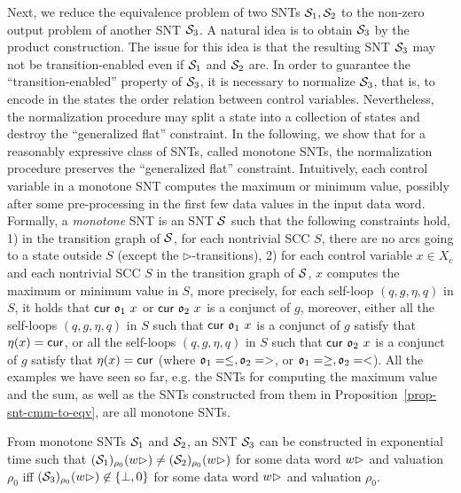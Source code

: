 Next, we reduce the equivalence problem of two SNTs ${\mathcal{S} }_1, {\mathcal{S} }_2$ to the non-zero output problem of another SNT ${\mathcal{S} }_3$. A natural idea is to obtain ${\mathcal{S} }_3$ by the product construction. The issue for this idea is that the resulting SNT ${\mathcal{S} }_3$ may not be transition-enabled even if ${\mathcal{S} }_1$ and ${\mathcal{S} }_2$ are. In order to guarantee the ``transition-enabled'' property of ${\mathcal{S} }_3$, it is necessary to normalize ${\mathcal{S} }_3$, that is, to encode in the states the order relation between control variables. Nevertheless, the normalization procedure may split a state into a collection of states and destroy the ``generalized flat'' constraint. In the following, we show that for a reasonably expressive class of SNTs, called monotone SNTs, the normalization procedure preserves the ``generalized flat'' constraint. Intuitively, each control variable in a monotone SNT computes the maximum or minimum value, possibly after some pre-processing in the first few data values in the input data word. Formally, a \emph{monotone} SNT is an SNT ${\mathcal{S} }$ such that the following constraints hold, 1)  in the transition graph of ${\mathcal{S} }$, for each nontrivial SCC $S$, there are no arcs going to a state outside $S$ (except the $\triangleright$-transitions), 2) for each control variable $x \in X_c$ and each nontrivial SCC $S$ in the transition graph of ${\mathcal{S} }$, $x$ computes the maximum or minimum value in $S$, more precisely, for each self-loop $(q, g, \eta, q)$ in $S$, it holds that $\mathsf{cur}\ \mathfrak{o}_1\ x$ or $\mathsf{cur}\ \mathfrak{o}_2\ x$ is a conjunct of $g$, moreover, either all the self-loops $(q, g, \eta, q)$ in $S$ such that $\mathsf{cur}\ \mathfrak{o}_1\ x$ is a conjunct of $g$ satisfy that $\eta(x)=\mathsf{cur}$, or all the self-loops $(q, g, \eta, q)$ in $S$ such that $\mathsf{cur}\ \mathfrak{o}_2\ x$ is a conjunct of $g$ satisfy that $\eta(x)=\mathsf{cur}$ (where $\mathfrak{o}_1 = \le, \mathfrak{o}_2 = >$, or $\mathfrak{o}_1 = \ge, \mathfrak{o}_2 = <$). All the examples we have seen so far, e.g. the SNTs for computing the maximum value and the sum, as well as the SNTs constructed from them in Proposition~\ref{prop-snt-cmm-to-eqv}, are all monotone SNTs.

\begin{proposition}\label{prop-snt-eqv-to-nzero}
From monotone SNTs ${\mathcal{S} }_1$ and ${\mathcal{S} }_2$, an SNT ${\mathcal{S} }_3$ can be constructed in exponential time such that  $({\mathcal{S} }_1)_{\rho_0}(w\rhd) \neq ({\mathcal{S} }_2)_{\rho_0}(w\rhd)$ for some  data word $w \rhd$ and valuation $\rho_0$  iff $({\mathcal{S} }_3)_{\rho_0}(w\rhd) \not\in \{\bot,0\}$ for some data word $w\rhd$ and valuation $\rho_0$.
\end{proposition}

